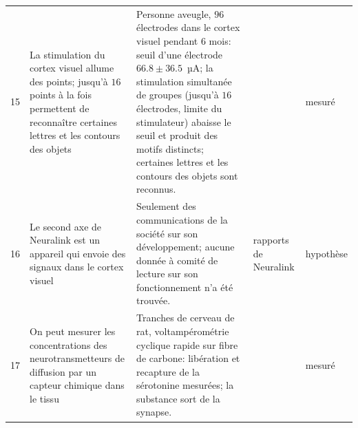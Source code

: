 {\begin{longtable}{>{\raggedright}p{0.5cm}>{\raggedright}p{4.0cm}>{\raggedright}p{5.6cm}>{\raggedright}p{2.3cm}>{\raggedright\arraybackslash}p{1.7cm}}
15 & La stimulation du cortex visuel allume des points; jusqu'à $16$ points à la fois permettent de reconnaître certaines lettres et les contours des objets & Personne aveugle, $96$ électrodes dans le cortex visuel pendant $6$ mois: seuil d'une électrode $66.8\pm36.5$~µA; la stimulation simultanée de groupes (jusqu'à $16$ électrodes, limite du stimulateur) abaisse le seuil et produit des motifs distincts; certaines lettres et les contours des objets sont reconnus. & \cite{Fernandez2021} & mesuré \\
16 & Le second axe de Neuralink est un appareil qui envoie des signaux dans le cortex visuel & Seulement des communications de la société sur son développement; aucune donnée à comité de lecture sur son fonctionnement n'a été trouvée. & rapports de Neuralink & hypothèse \\
17 & On peut mesurer les concentrations des neurotransmetteurs de diffusion par un capteur chimique dans le tissu & Tranches de cerveau de rat, voltampérométrie cyclique rapide sur fibre de carbone: libération et recapture de la sérotonine mesurées; la substance sort de la synapse. & \cite{Bunin1998} & mesuré \\
\bottomrule
\end{longtable}}
